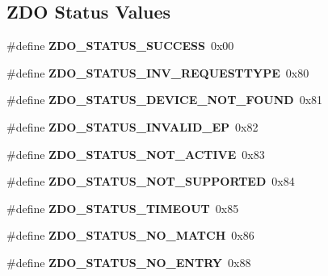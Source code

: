 \subsection*{Z\+DO Status Values}
\begin{DoxyCompactItemize}
\item 
\mbox{\label{group__zdo_gaca852eaafe6a2a7e8fc42a2963d473bf}} 
\#define {\bfseries Z\+D\+O\+\_\+\+S\+T\+A\+T\+U\+S\+\_\+\+S\+U\+C\+C\+E\+SS}~0x00
\item 
\mbox{\label{group__zdo_ga4e093ba54e396ff7c323fab9ea077d18}} 
\#define {\bfseries Z\+D\+O\+\_\+\+S\+T\+A\+T\+U\+S\+\_\+\+I\+N\+V\+\_\+\+R\+E\+Q\+U\+E\+S\+T\+T\+Y\+PE}~0x80
\item 
\mbox{\label{group__zdo_ga539854426a1115ab577f821085ff2256}} 
\#define {\bfseries Z\+D\+O\+\_\+\+S\+T\+A\+T\+U\+S\+\_\+\+D\+E\+V\+I\+C\+E\+\_\+\+N\+O\+T\+\_\+\+F\+O\+U\+ND}~0x81
\item 
\mbox{\label{group__zdo_gac3028cb83e21749768eca42838263019}} 
\#define {\bfseries Z\+D\+O\+\_\+\+S\+T\+A\+T\+U\+S\+\_\+\+I\+N\+V\+A\+L\+I\+D\+\_\+\+EP}~0x82
\item 
\mbox{\label{group__zdo_ga557bd739746cc08113ede4935c1918f2}} 
\#define {\bfseries Z\+D\+O\+\_\+\+S\+T\+A\+T\+U\+S\+\_\+\+N\+O\+T\+\_\+\+A\+C\+T\+I\+VE}~0x83
\item 
\mbox{\label{group__zdo_gadd64e2c0f5b7126a0c906f0ec6e60473}} 
\#define {\bfseries Z\+D\+O\+\_\+\+S\+T\+A\+T\+U\+S\+\_\+\+N\+O\+T\+\_\+\+S\+U\+P\+P\+O\+R\+T\+ED}~0x84
\item 
\mbox{\label{group__zdo_gaea9de0d4efef9cd1d1ae12dae22f1d37}} 
\#define {\bfseries Z\+D\+O\+\_\+\+S\+T\+A\+T\+U\+S\+\_\+\+T\+I\+M\+E\+O\+UT}~0x85
\item 
\mbox{\label{group__zdo_ga00eda593d9937e6c55f9da1ab509091f}} 
\#define {\bfseries Z\+D\+O\+\_\+\+S\+T\+A\+T\+U\+S\+\_\+\+N\+O\+\_\+\+M\+A\+T\+CH}~0x86
\item 
\mbox{\label{group__zdo_ga1f183b5c7a93f106d28696acb96652d6}} 
\#define {\bfseries Z\+D\+O\+\_\+\+S\+T\+A\+T\+U\+S\+\_\+\+N\+O\+\_\+\+E\+N\+T\+RY}~0x88

\end{DoxyCompactItemize}
